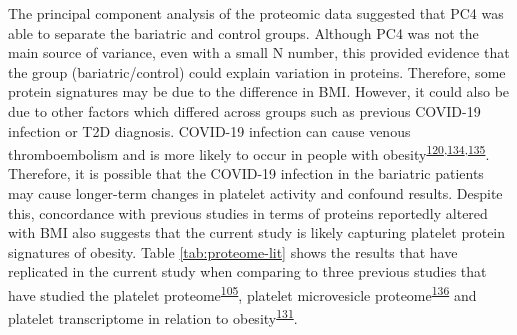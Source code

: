 \documentclass[11pt,twoside]{bristolthesis}
\begin{document}
The principal component analysis of the proteomic data suggested that PC4 was able to separate the bariatric and control groups. Although PC4 was not the main source of variance, even with a small N number, this provided evidence that the group (bariatric/control) could explain variation in proteins. Therefore, some protein signatures may be due to the difference in BMI. However, it could also be due to other factors which differed across groups such as previous COVID-19 infection or T2D diagnosis. COVID-19 infection can cause venous thromboembolism and is more likely to occur in people with obesity\textsuperscript{\protect\hyperlink{ref-Klok2020}{120},\protect\hyperlink{ref-McFadyen2020}{134},\protect\hyperlink{ref-Wang2021}{135}}. Therefore, it is possible that the COVID-19 infection in the bariatric patients may cause longer-term changes in platelet activity and confound results. Despite this, concordance with previous studies in terms of proteins reportedly altered with BMI also suggests that the current study is likely capturing platelet protein signatures of obesity. Table \ref{tab:proteome-lit} shows the results that have replicated in the current study when comparing to three previous studies that have studied the platelet proteome\textsuperscript{\protect\hyperlink{ref-Barrachina2019}{105}}, platelet microvesicle proteome\textsuperscript{\protect\hyperlink{ref-Grande2019}{136}} and platelet transcriptome in relation to obesity\textsuperscript{\protect\hyperlink{ref-Freedman2010}{131}}.
\end{document}

